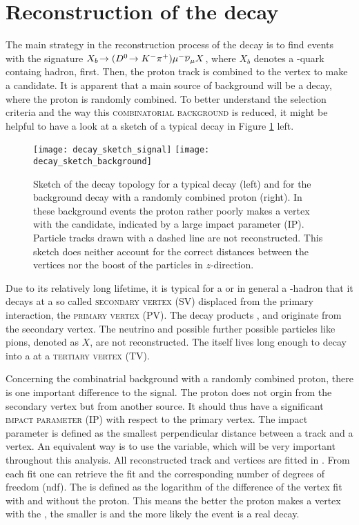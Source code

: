 \section{Reconstruction of the decay \LbToDpmunuX}
The main strategy in the reconstruction process of the decay \LbToDpmunuX is to find events with the signature $X_{b}\!\rightarrow ({{D}^0}\!\rightarrow {\ensuremath{{K}^-}}{\ensuremath{{\pi}^+}}) {\mu^-} {{\overline{\nu}}_\mu} X$, where $X_b$ denotes a \bquark-quark containg hadron, first.
Then, the proton track is combined to the \Dz\mun vertex to make a \LbToDpmunuX candidate.
It is apparent that a main source of background will be a  decay, where the proton is randomly combined.
To better understand the selection criteria and the way this \textsc{combinatorial background} is reduced, it might be helpful to have a look at a sketch of a typical \LbToDpmunuX decay in Figure \ref{fig:DecaySketch} left.
\begin{figure}[hptb]
	\centering
	\texttt{[image: decay\_sketch\_signal]}
	\texttt{[image: decay\_sketch\_background]}
	\caption{
        Sketch of the decay topology for a typical \LbToDpmunuX decay (left) and for the background decay  with a randomly combined proton (right).
        In these background events the proton rather poorly makes a vertex with the \Dz\mun candidate, indicated by a large impact parameter (IP).
        Particle tracks drawn with a dashed line are not reconstructed.
        This sketch does neither account for the correct distances between the vertices nor the boost of the particles in $z$-direction.
    }
	\label{fig:DecaySketch}
\end{figure}
Due to its relatively long lifetime, it is typical for a \Lb or in general a \bquark-hadron that it decays at a so called \textsc{secondary vertex (SV)} displaced from the primary \proton\proton interaction, the \textsc{primary vertex (PV)}.
The decay products \Dz, \mun and \proton  originate from the secondary vertex. 
The neutrino and possible further possible particles like pions, denoted as $X$, are not reconstructed.
The \Dz itself lives long enough to decay into a \Km\pip at a \textsc{tertiary vertex (TV)}.

Concerning the combinatrial background  with a randomly combined proton, there is one important difference to the signal.
The proton does not orgin from the secondary vertex but from another source.
It should thus have a significant \textsc{impact parameter (IP)} with respect to the primary vertex.
The impact parameter is defined as the smallest perpendicular distance between a track and a vertex.
An equivalent way is to use the \logIP variable, which will be very important throughout this analysis.
All reconstructed track and vertices are fitted in \lhcb.
From each fit one can retrieve the fit \chisq and the corresponding number of degrees of freedom (ndf).
The \logIP is defined as the logarithm of the difference of the \Dz\mun vertex fit \chisq with and without the proton.
This means the better the proton makes a vertex with the \Dz\mun, the smaller is \logIP and the more likely the event is a real \LbToDpmunuX decay.

